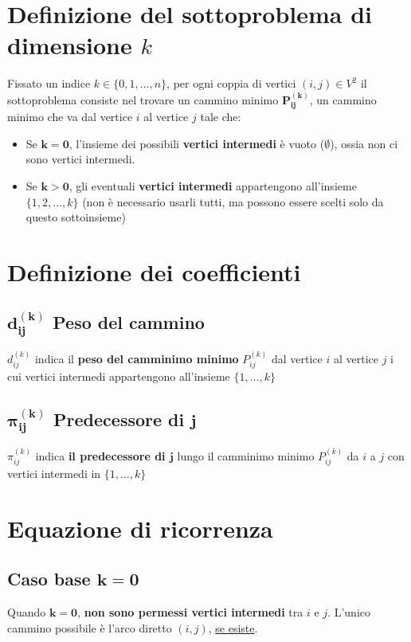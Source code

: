 \section{Definizione del sottoproblema di dimensione $k$}
Fissato un indice $k \in \{0,1,\dots,n\}$, per ogni coppia di vertici $(i,j) \in V^2$ il sottoproblema consiste nel trovare un cammino minimo $\mathbf{P_{ij}^{(k)}}$, un cammino minimo che va dal vertice $i$ al vertice $j$ tale che:
\begin{itemize}
    \item Se $\mathbf{k=0}$, l'insieme dei possibili \textbf{vertici intermedi} è vuoto ($\emptyset$), ossia non ci sono vertici intermedi.
    
    \item Se $\mathbf{k>0}$, gli eventuali \textbf{vertici intermedi} appartengono all'insieme $\{1,2,\dots,k\}$ (non è necessario usarli tutti, ma possono essere scelti solo da questo sottoinsieme)
\end{itemize}

\section{Definizione dei coefficienti}
\subsection{$\mathbf{d_{ij}^{(k)}}$ Peso del cammino}
$d_{ij}^{(k)}$ indica il \textbf{peso del camminimo minimo} $P_{ij}^(k)$ dal vertice $i$ al vertice $j$ i cui vertici intermedi appartengono all'insieme $\{1,\dots,k\}$


\subsection{$\mathbf{\pi_{ij}^{(k)}}$ Predecessore di $\mathbf{j}$}
$\pi_{ij}^{(k)}$ indica \textbf{il predecessore di $\mathbf{j}$} lungo il camminimo minimo $P_{ij}^{(k)}$ da $i$ a $j$ con vertici intermedi in $\{1,\dots,k\}$

\section{Equazione di ricorrenza}
\subsection{Caso base $\mathbf{k=0}$}
Quando $\mathbf{k=0}$, \textbf{non sono permessi vertici intermedi} tra $i$ e $j$. L'unico cammino possibile è l'arco diretto $(i,j)$, \uline{se esiste}.

